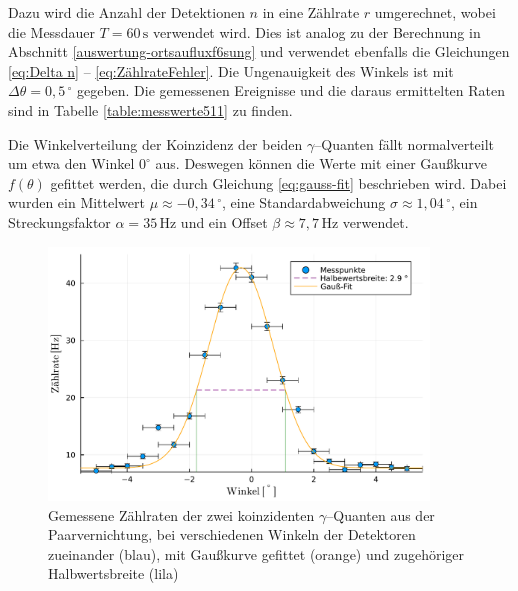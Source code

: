 \documentclass[12pt,a4paper]{scrartcl}
\numberwithin{equation}{section} %
\begin{document}
Dazu wird die Anzahl der Detektionen $n$ in eine Zählrate $r$ umgerechnet, wobei die Messdauer $T=60\,\mathrm{s}$ verwendet wird. Dies ist analog zu der Berechnung in Abschnitt \ref{auswertung-ortsaufluxf6sung}  und verwendet ebenfalls die Gleichungen \eqref{eq:Delta n} -- \eqref{eq:ZählrateFehler}. Die Ungenauigkeit des Winkels ist mit $\Delta \theta = 0,5\,^\circ$ gegeben. Die gemessenen Ereignisse und die daraus ermittelten Raten sind in Tabelle \ref{table:messwerte511} zu finden.

Die Winkelverteilung der Koinzidenz der beiden $\gamma$--Quanten fällt normalverteilt um etwa den Winkel $0^\circ$ aus. Deswegen können die Werte mit einer Gaußkurve $f(\theta)$ gefittet werden, die durch Gleichung \eqref{eq:gauss-fit} beschrieben wird. Dabei wurden ein Mittelwert $\mu\approx-0,34 \mathrm{\, ^\circ}$, eine Standardabweichung $\sigma\approx 1,04 \mathrm{\, ^\circ}$, ein Streckungsfaktor $\alpha=35 \mathrm{\, Hz}$ und ein Offset $\beta\approx7,7 \mathrm{\, Hz}$ verwendet.

\begin{figure}[h]
	\centering
	\includegraphics[width=0.9\textwidth]{../media/B3.4/plot511.pdf}
	\caption{Gemessene Zählraten der zwei koinzidenten $\gamma$--Quanten aus der Paarvernichtung, bei verschiedenen Winkeln der Detektoren zueinander (blau), mit Gaußkurve gefittet (orange) und zugehöriger Halbwertsbreite (lila)}
	\label{fig:plot511}
\end{figure}
\end{document}
